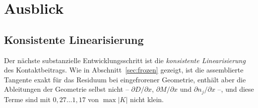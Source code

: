 \documentclass[a4paper,11pt]{article}
\def\bm#1{#1}%
\let\stdsection\section
\renewcommand{\section}{\clearpage\stdsection}
\begin{document}
\section{Ausblick}
\label{sec:ausblick}

\subsection{Konsistente Linearisierung}
\label{sec:ausblick:lin}

Der nächste substanzielle Entwicklungsschritt ist die \emph{konsistente Linearisierung} des
Kontaktbeitrags. Wie in Abschnitt~\ref{sec:frozen} gezeigt, ist die assemblierte Tangente exakt
für das Residuum bei eingefrorener Geometrie, enthält aber die Ableitungen der Geometrie selbst
nicht -- $\partial\bm D/\partial\bm x$, $\partial\bm M/\partial\bm x$ und
$\partial\bm n_j/\partial\bm x$ --, und diese Terme sind mit $0{,}27\ldots1{,}17$ von
$\max|\bm K|$ nicht klein.
\end{document}
